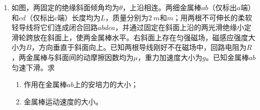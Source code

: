\begin{enumerate}
{\begin{enumerate}
\end{enumerate}


}



\item 
{}
如图，两固定的绝缘斜面倾角均为$ \theta $，上沿相连。两细金属棒$ ab $（仅标出$ a $端）和$ cd $（仅标出$ c $端）长度均为$ L $，质量分别为$ 2 \ m $和$ m $；用两根不可伸长的柔软轻导线将它们连成闭合回路$ abdca $，并通过固定在斜面上沿的两光滑绝缘小定滑轮跨放在斜面上，使两金属棒水平。右斜面上存在匀强磁场，磁感应强度大小为$ B $，方向垂直于斜面向上。已知两根导线刚好不在磁场中，回路电阻为$ R $，两金属棒与斜面间的动摩擦因数均为$ \mu $，重力加速度大小为$ g $。已知金属棒$ ab $匀速下滑。求
\begin{enumerate}
\renewcommand{\labelenumii}{(\arabic{enumii})}

\item 
作用在金属棒$ ab $上的安培力的大小；

\item 
金属棒运动速度的大小。

\end{enumerate}
\begin{figure}[h!]
\flushright

\end{figure}




\end{enumerate}
